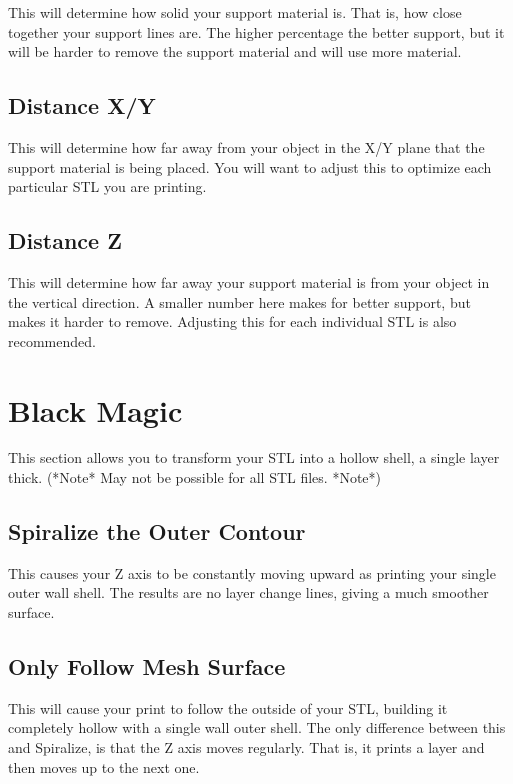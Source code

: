 This will determine how solid your support material is. That is, how close together your support lines are. The higher percentage the better support, but it will be harder to remove the support material and will use more material.

\subsection{Distance X/Y}

This will determine how far away from your object in the X/Y plane that the support material is being placed. You will want to adjust this to optimize each particular STL you are printing.

\subsection{Distance Z}

This will determine how far away your support material is from your object in the vertical direction. A smaller number here makes for better support, but makes it harder to remove. Adjusting this for each individual STL is also recommended.

\section{Black Magic}

This section allows you to transform your STL into a hollow shell, a single layer thick. (*Note* May not be possible for all STL files. *Note*)

\subsection{Spiralize the Outer Contour}

This causes your Z axis to be constantly moving upward as printing your single outer wall shell. The results are no layer change lines, giving a much smoother surface.

\subsection{Only Follow Mesh Surface}

This will cause your print to follow the outside of your STL, building it completely hollow with a single wall outer shell. The only difference between this and Spiralize, is that the Z axis moves regularly. That is, it prints a layer and then moves up to the next one.

